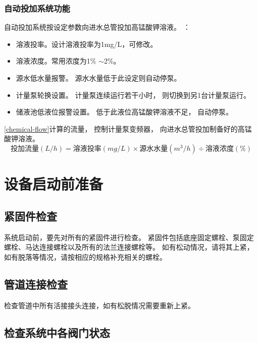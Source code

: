 \documentclass[UTF8,a4paper,12pt,titlepage]{ctexart}
\begin{document}
      \subsubsection{自动投加系统功能}
         自动投加系统按设定参数向进水总管投加高锰酸钾溶液。
         ：
         \begin{itemize}
            \item 溶液投率。设计溶液投率为1mg/L，可修改。
            \item 溶液浓度。常用浓度为1\% $\sim$2\%。
            \item 源水低水量报警。
            源水水量低于此设定则自动停泵。
            \item 计量泵轮换设置。
            计量泵连续运行若干小时，
            则切换到另1台计量泵运行。
            \item 储液池低液位报警设置。
            低于此液位高锰酸钾溶液不足，
            自动停泵。
         \end{itemize}
         \ref{chemical-flow}计算的流量，
         控制计量泵变频器，
         向进水总管投加制备好的高锰酸钾溶液。
         \begin{equation}
            \label{chemical-flow}
            \mbox{投加流量}(L/h) = \mbox{溶液投率}(mg/L) \times 
            \mbox{源水水量}(m^3/h) \div 
            \mbox{溶液浓度}(\%)
         \end{equation}


\newpage %

\section{设备启动前准备}\label{sec:sg1}
   \subsection{紧固件检查}
      系统启动前，要先对所有的紧固件进行检查。
      紧固件包括底座固定螺栓、泵固定螺栓、马达连接螺栓以及所有的法兰连接螺栓等。
      如有松动情况，请将其上紧，如有脱落等情况，请按相应的规格补充相关的螺栓。

   \subsection{管道连接检查}
      检查管道中所有活接接头连接，如有松脱情况需要重新上紧。

   \subsection{检查系统中各阀门状态}
\end{document}
